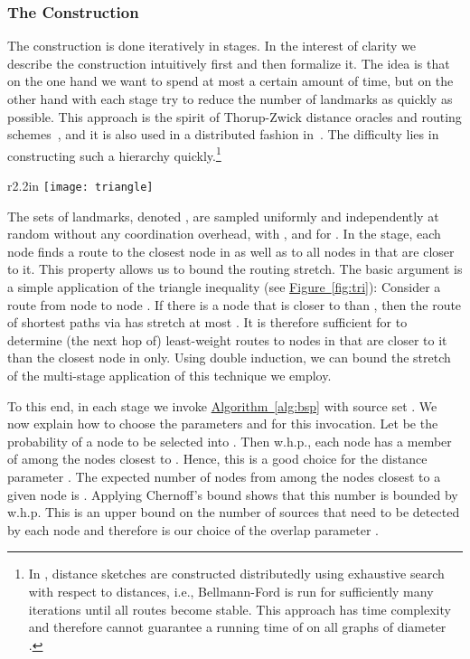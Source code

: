 \documentclass[letterpaper,11pt]{article}
\newcommand{\namedref}[2]{\hyperref[#2]{#1~\ref*{#2}}}
\newcommand{\figref}[1]{\namedref{Figure}{#1}}
\newcommand{\algref}[1]{\namedref{Algorithm}{#1}}
\begin{document}
\subsubsection*{The Construction}
The construction is done iteratively in  stages. In the interest of clarity
we describe the construction intuitively first and then formalize it. The idea
is that on the one hand we want to spend
at most a certain amount of time, but on the other hand with each stage try to
reduce the number of landmarks as quickly as possible. This approach is
the spirit of Thorup-Zwick distance oracles and routing
schemes~\cite{TZ-routing,TZ-05}, and it is also used in a distributed
fashion in~\cite{DDP}. The difficulty lies in constructing such a
hierarchy quickly.\footnote{In \cite{DDP}, distance sketches are constructed
  distributedly using exhaustive search with
  respect to distances, i.e., Bellmann-Ford is run for
  sufficiently many iterations until all routes become stable. This
  approach has time complexity  and therefore cannot guarantee a
  running time of  on all graphs of diameter .
}

\begin{wrapfigure}{r}{2.2in}
\centering
\texttt{[image: triangle]}
\caption{\small The distance from  to  is at least one third
of the length of the route from  to  via .}
\label{fig:tri}
\end{wrapfigure}
The sets of landmarks, denoted , are sampled uniformly
and independently 
at random without any coordination overhead, with , and 
 for .
In the  stage, each node finds
a route to the closest node in  as well as
to all nodes in  that are closer to it.
This property allows us to bound the routing stretch. The basic argument is a simple
application of the triangle inequality (see \figref{fig:tri}): Consider a route  from node
 to node . If there is a node  that is closer to  than
, then the route of shortest paths via  has stretch at most .
It is therefore sufficient for 
to determine (the next hop of) least-weight routes to nodes in
 that are closer to it than the closest node in 
only. Using double induction, we can bound the stretch of the
multi-stage application of this technique we employ.

To this end, in each stage we invoke \algref{alg:bsp} with source set
. We now explain how to choose the parameters  and
 for this invocation. Let  be the probability of 
a node to be selected into . Then w.h.p., each node  has a member of
 among the  nodes closest to . Hence, this is a good
choice for the distance parameter . The expected number of nodes from
 among the   nodes closest to a given node is .
Applying Chernoff's bound shows that this number is bounded by
 w.h.p. This is an upper bound on
the number of sources that need to be detected by each node and therefore is our
choice of the overlap parameter .
\end{document}
